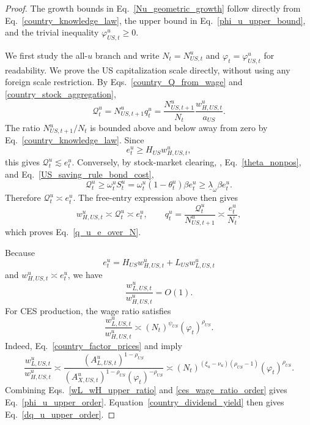 \documentclass{article}
\begin{document}
\begin{proof}
The growth bounds in Eq.~\eqref{Nu_geometric_growth} follow directly from Eq.~\eqref{country_knowledge_law}, the upper bound in Eq.~\eqref{phi_u_upper_bound}, and the trivial inequality $\varphi_{US,t}^u\ge0$.

We first study the all-$u$ branch and write $N_t=N_{US,t}^u$ and $\varphi_t=\varphi_{US,t}^u$ for readability. We prove the US capitalization scale directly, without using any foreign scale restriction. By Eqs.~\eqref{country_Q_from_wage} and \eqref{country_stock_aggregation},
\[
\mathcal Q_t^u
=
N_{US,t+1}^uq_t^u
=
\frac{N_{US,t+1}^u}{N_t}\frac{w_{H,US,t}^u}{a_{US}}.
\]
The ratio $N_{US,t+1}^u/N_t$ is bounded above and below away from zero by Eq.~\eqref{country_knowledge_law}. Since
\[
e_t^u\ge H_{US}w_{H,US,t}^u,
\]
this gives $\mathcal Q_t^u\lesssim e_t^u$. Conversely, by stock-market clearing, , Eq.~\eqref{theta_nonpos}, and Eq.~\eqref{US_saving_rule_bond_cost},
\[
\mathcal Q_t^u
\ge
\omega_t^uS_t^u
=
\omega_t^u(1-\theta_t^u)\beta e_t^u
\ge
\underline\lambda_\omega\beta e_t^u.
\]
Therefore $\mathcal Q_t^u\asymp e_t^u$. The free-entry expression above then gives
\begin{equation}\label{wH_e_Q_order}
w_{H,US,t}^u\asymp \mathcal Q_t^u\asymp e_t^u,
\qquad
q_t^u=\frac{\mathcal Q_t^u}{N_{US,t+1}^u}\asymp \frac{e_t^u}{N_t},
\end{equation}
which proves Eq.~\eqref{q_u_e_over_N}.

Because
\[
e_t^u=H_{US}w_{H,US,t}^u+L_{US}w_{L,US,t}^u
\]
and $w_{H,US,t}^u\asymp e_t^u$, we have
\begin{equation}\label{wL_wH_upper_ratio}
\frac{w_{L,US,t}^u}{w_{H,US,t}^u}=O(1).
\end{equation}
For CES production, the wage ratio satisfies
\begin{equation}\label{ces_wage_ratio_order}
\frac{w_{L,US,t}^u}{w_{H,US,t}^u}
\asymp
(N_t)^{\psi_{US}}(\varphi_t)^{\rho_{US}}.
\end{equation}
Indeed, Eq.~\eqref{country_factor_prices} and  imply
\[
\frac{w_{L,US,t}^u}{w_{H,US,t}^u}
\asymp
\frac{(A_{L,US,t}^u)^{1-\rho_{US}}}{(A_{X,US,t}^u)^{1-\rho_{US}}(\varphi_t)^{-\rho_{US}}}
\asymp
(N_t)^{(\xi_u-\nu_u)(\rho_{US}-1)}(\varphi_t)^{\rho_{US}}.
\]
Combining Eqs.~\eqref{wL_wH_upper_ratio} and \eqref{ces_wage_ratio_order} gives Eq.~\eqref{phi_u_upper_order}. Equation~\eqref{country_dividend_yield} then gives Eq.~\eqref{dq_u_upper_order}.


\end{proof}
\end{document}
